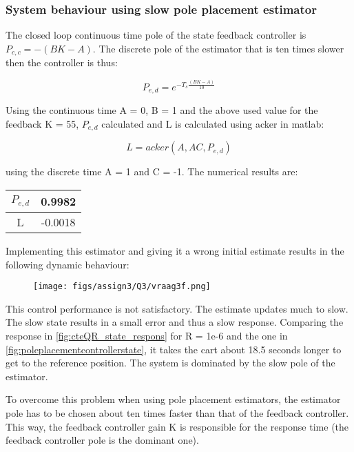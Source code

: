 \documentclass[a4paper]{article}
\newcommand{\newpar}{\vspace{.3cm}\noindent}
\begin{document}
\subsubsection{System behaviour using slow pole placement estimator}

The closed loop continuous time pole of the state feedback controller is $P_{c,c} = -(BK-A)$. The discrete pole of the estimator that is ten times slower then the controller is thus:

\begin{equation}
    P_{e,d} = e^{-T_{s}\frac{\left(BK-A\right)}{10}}
\end{equation}

\newpar
Using the continuous time A = 0, B = 1 and the above used value for the feedback K = 55, $P_{e,d}$ calculated and L is calculated using acker in matlab:

\begin{equation}
    L = acker(A,AC,P_{e,d})
\end{equation}

\nawpar
using the discrete time A = 1 and C = -1. The numerical results are:

\begin{center}
    \begin{tabular}{|c|c|}
        \hline
        $P_{e,d}$ & 0.9982 \\
        \hline
        L & -0.0018 \\
        \hline
    \end{tabular}
\end{center}

\newpar
Implementing this estimator and giving it a wrong initial estimate results in the following dynamic behaviour:

\begin{figure}[H]
    \centering
    \texttt{[image: figs/assign3/Q3/vraag3f.png]}
    \label{fig:poleplacementcontrollerstate}
\end{figure}

\newpar
This control performance is not satisfactory. The estimate updates much to slow. The slow state results in a small error and thus a slow response. Comparing the response in \autoref{fig:cteQR_state_respons} for R = 1e-6 and the one in \autoref{fig:poleplacementcontrollerstate}, it takes the cart about 18.5 seconds longer to get to the reference position. The system is dominated by the slow pole of the estimator.

\newpar To overcome this problem when using pole placement estimators, the estimator pole has to be chosen about ten times faster than that of the feedback controller. This way, the feedback controller gain K is responsible for the response time (the feedback controller pole is the dominant one).
\end{document}
